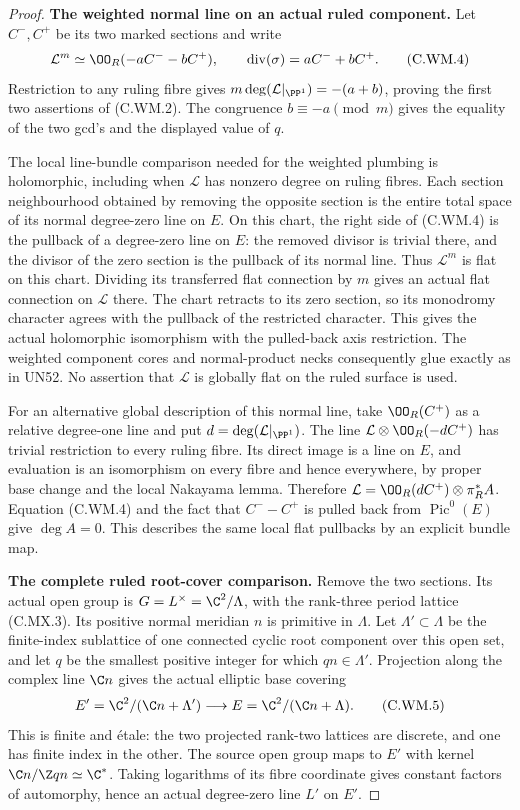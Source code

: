 \begin{proof}
\par\medskip\noindent\textbf{The weighted normal line on an actual ruled component.}
Let $C^-,C^+$ be its two marked sections and write
\[
  \mathcal L^{m}
       \simeq \OO_R(-aC^- -bC^+),\qquad
       \operatorname{div}(\sigma)=aC^-+bC^+.
\tag{C.WM.4}
\]
Restriction to any ruling fibre gives
$m\deg(\mathcal L|_{\PP^1})=-(a+b)$,
proving the first two assertions of (C.WM.2).
The congruence $b\equiv-a\pmod m$ gives
the equality of the two gcd's and the displayed
value of $q$.

The local line-bundle comparison needed for the weighted
plumbing is holomorphic, including when $\mathcal L$
has nonzero degree on ruling fibres.
Each section neighbourhood obtained by removing the
opposite section is the entire total space of its
normal degree-zero line on $E$.
On this chart, the right side of (C.WM.4) is the
pullback of a degree-zero line on $E$:
the removed divisor is trivial there, and the divisor
of the zero section is the pullback of its normal line.
Thus $\mathcal L^m$ is flat on this chart.
Dividing its transferred flat connection by $m$
gives an actual flat connection on $\mathcal L$ there.
The chart retracts to its zero section, so its
monodromy character agrees with the pullback of
the restricted character. This gives the actual
holomorphic isomorphism with the pulled-back
axis restriction. The weighted component cores
and normal-product necks consequently glue exactly
as in UN52. No assertion that $\mathcal L$ is
globally flat on the ruled surface is used.

For an alternative global description of this
normal line, take $\OO_R(C^+)$ as a relative
degree-one line and put
$d=\deg(\mathcal L|_{\PP^1})$.
The line $\mathcal L\otimes\OO_R(-dC^+)$
has trivial restriction to every ruling fibre.
Its direct image is a line on $E$, and evaluation
is an isomorphism on every fibre and hence everywhere,
by proper base change and the local Nakayama lemma.
Therefore
$\mathcal L=\OO_R(dC^+)\otimes\pi_R^*A$.
Equation (C.WM.4) and the fact that
$C^--C^+$ is pulled back from $\operatorname{Pic}^0(E)$
give $\deg A=0$. This describes the same local
flat pullbacks by an explicit bundle map.

\par\medskip\noindent\textbf{The complete ruled root-cover comparison.}
Remove the two sections. Its actual open group is
$G=L^\times=\C^2/\Lambda$, with the rank-three
period lattice (C.MX.3). Its positive normal
meridian $n$ is primitive in $\Lambda$.
Let $\Lambda'\subset\Lambda$ be the finite-index
sublattice of one connected cyclic root component
over this open set, and let $q$ be the smallest
positive integer for which $qn\in\Lambda'$.
Projection along the complex line $\C n$
gives the actual elliptic base covering
\[
 E'=\C^2/(\C n+\Lambda')
      \longrightarrow
 E=\C^2/(\C n+\Lambda).
\tag{C.WM.5}
\]
This is finite and \'{e}tale: the two projected
rank-two lattices are discrete, and one has
finite index in the other. The source open
group maps to $E'$ with kernel
$\C n/\Z qn\simeq\C^*$.
Taking logarithms of its fibre coordinate
gives constant factors of automorphy, hence
an actual degree-zero line $L'$ on $E'$.


\end{proof}
